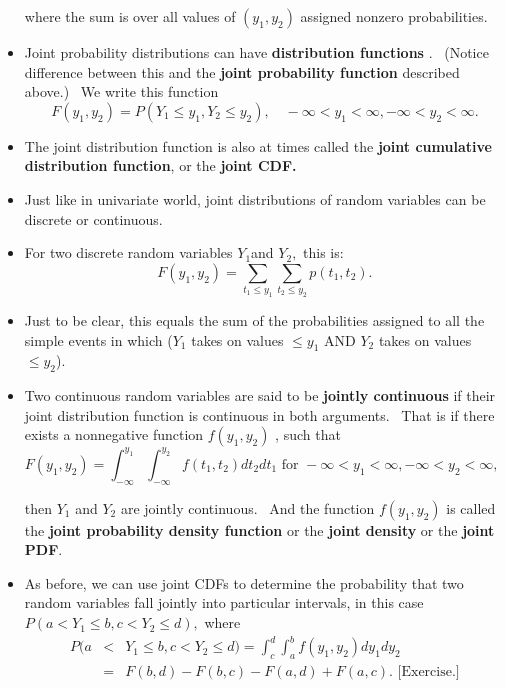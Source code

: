 \documentclass[11pt]{article}
\begin{document}
\begin{itemize}
where the sum is over all values of $(y_{1},y_{2})$ assigned nonzero
probabilities.

\item Joint probability distributions can have \textbf{distribution functions%
}. \ (Notice difference between this and the \textbf{joint probability
function} described above.) \ We write this function 
\begin{equation*}
F(y_{1},y_{2})=P(Y_{1}\leq y_{1},Y_{2}\leq y_{2}),\quad -\infty
<y_{1}<\infty ,-\infty <y_{2}<\infty .
\end{equation*}

\item The joint distribution function is also at times called the \textbf{%
joint cumulative distribution function}, or the \textbf{joint CDF. }

\item Just like in univariate world, joint distributions of random variables
can be discrete or continuous.\textbf{\ }

\item For two discrete random variables $Y_{1}$and $Y_{2},$ this is:%
\begin{equation*}
F(y_{1},y_{2})=\sum_{t_{1}\leq y_{1}}\sum_{t_{2}\leq y_{2}}p(t_{1},t_{2}).
\end{equation*}

\item Just to be clear, this equals the sum of the probabilities assigned to
all the simple events in which ($Y_{1}$ takes on values $\leq y_{1}$ AND $%
Y_{2}$ takes on values $\leq y_{2}$)$.$

\item Two continuous random variables are said to be \textbf{jointly
continuous }if their joint distribution function is continuous in both
arguments. \ That is if there exists a nonnegative function $f(y_{1},y_{2})$%
, such that%
\begin{equation*}
F(y_{1},y_{2})=\int_{-\infty }^{y_{1}}\int_{-\infty
}^{y_{2}}f(t_{1},t_{2})dt_{2}dt_{1}\text{ \ \ for }-\infty <y_{1}<\infty
,-\infty <y_{2}<\infty ,\text{\ }
\end{equation*}

then $Y_{1}$ and $Y_{2}$ are jointly continuous. \ And the function $%
f(y_{1},y_{2})$ is called the \textbf{joint probability density function }or
the \textbf{joint density }or the \textbf{joint PDF}.

\item As before, we can use joint CDFs to determine the probability that two
random variables fall jointly into particular intervals, in this case $%
P(a<Y_{1}\leq b,c<Y_{2}\leq d),$ where%
\begin{eqnarray*}
P(a &<&Y_{1}\leq b,c<Y_{2}\leq
d)=\int_{c}^{d}\int_{a}^{b}f(y_{1},y_{2})dy_{1}dy_{2} \\
&=&F(b,d)-F(b,c)-F(a,d)+F(a,c).\text{ \ [Exercise.]}
\end{eqnarray*}


\end{itemize}
\end{document}
